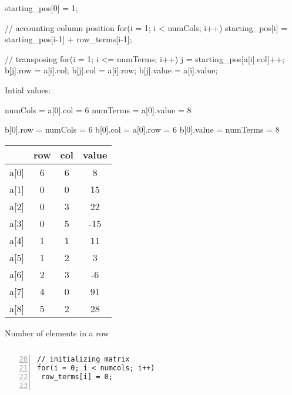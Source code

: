 \documentclass[newPxFont,sthlmFooter,nooffset]{beamer}
\begin{document}
\begin{frame}
\begin{ncodedef}
{{        starting_pos[0] = 1;

        // accounting column position 
        for(i = 1; i < numCols; i++)
            starting_pos[i] = starting_pos[i-1] + row_terms[i-1];

        // transposing
        for(i = 1; i <= numTerms; i++){
            j = starting_pos[a[i].col]++;
            b[j].row = a[i].col;
            b[j].col = a[i].row;
            b[j].value = a[i].value;
        }
    }
}  
\end{ncodedef}

\framebreak

Intial values: 
\begin{codedefnb}
numCols = a[0].col = 6
numTerms = a[0].value = 8

b[0].row = numCols = 6
b[0].col = a[0].row = 6
b[0].value = numTerms = 8
\end{codedefnb}

{\scriptsize
\begin{tabular}{r c c c}
  & row & col & value \\ \hline
  a[0]&  6  &  6  &   8   \\
  a[1]&  0  &  0  &  15   \\ 
  a[2]&  0  &  3  &  22   \\ 
  a[3]&  0  &  5  & -15   \\ 
  a[4]&  1  &  1  &  11   \\ 
  a[5]&  1  &  2  &   3   \\ 
  a[6]&  2  &  3  &  -6   \\ 
  a[7]&  4  &  0  &  91   \\ 
  a[8]&  5  &  2  &  28   \\ 
\end{tabular}
}

\framebreak
Number of elements in a row 

\begin{columns}
  \begin{column}{0.5\textwidth}
    \begin{lstlisting}[frame=single, lineskip = -1pt, numbers = left, firstnumber=20, framexleftmargin=15pt, framexrightmargin=-5pt, xleftmargin = 25pt ]
// initializing matrix
for(i = 0; i < numcols; i++) 
 row_terms[i] = 0;  


\end{lstlisting}
\end{column}
\end{columns}
\end{frame}
\end{document}
